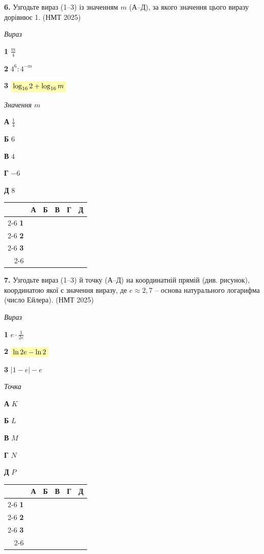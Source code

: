 \documentclass[14pt]{extarticle}
\newcommand{\answerGrid}{
    \begingroup
    \renewcommand{\arraystretch}{1.3} 
    \setlength{\tabcolsep}{7pt} 
    \begin{tabular}{r|c|c|c|c|c|}
         \multicolumn{1}{c}{} & \multicolumn{1}{c}{\textbf{А}} & \multicolumn{1}{c}{\textbf{Б}} & \multicolumn{1}{c}{\textbf{В}} & \multicolumn{1}{c}{\textbf{Г}} & \multicolumn{1}{c}{\textbf{Д}} \\ \cline{2-6}
         \textbf{1} & & & & & \\ \cline{2-6}
         \textbf{2} & & & & & \\ \cline{2-6}
         \textbf{3} & & & & & \\ \cline{2-6}
    \end{tabular}
    \endgroup
}
\newcommand{\matchingLayout}[3]{
    \noindent
    \begin{minipage}[t]{0.40\textwidth}
        #1
    \end{minipage}%
    \hfill
    \begin{minipage}[t]{0.28\textwidth}
        #2
    \end{minipage}%
    \hfill
    \begin{minipage}[t]{0.30\textwidth}
        \vspace{0pt}
        \begin{flushright}
        #3
        \end{flushright}
    \end{minipage}
}
\newcommand{\nmtyear}[1]{\hfill{\small\color{yearcolor}(НМТ #1)}}
\begin{document}
\noindent\textbf{6.} Узгодьте вираз (1--3) із значенням $m$ (А--Д), за якого значення цього виразу дорівнює 1. \nmtyear{2025}
\vspace{0.3cm}

\matchingLayout{\textit{Вираз}

\textbf{1} \quad $\displaystyle\frac{m}{4}$

\textbf{2} \quad $4^6 : 4^{-m}$

\textbf{3} \quad $\colorbox{yellow!30}{$\log_{16} 2 + \log_{16} m$}$
}{
\textit{Значення $m$}

\textbf{А} \quad $\displaystyle\frac{1}{4}$

\textbf{Б} \quad $6$

\textbf{В} \quad $4$

\textbf{Г} \quad $-6$

\textbf{Д} \quad $8$
}{
\answerGrid
}

\vspace{0.8cm}

\noindent\textbf{7.} Узгодьте вираз (1--3) й точку (А--Д) на координатній прямій (див. рисунок), координатою якої є значення виразу, де $e \approx 2{,}7$ -- основа натурального логарифма (число Ейлера). \nmtyear{2025}
\vspace{0.3cm}

\begin{center}
\end{center}

\vspace{0.3cm}

\matchingLayout{\textit{Вираз}

\textbf{1} \quad $e \cdot \displaystyle\frac{1}{2e}$

\textbf{2} \quad $\colorbox{yellow!30}{$\ln 2e - \ln 2$}$

\textbf{3} \quad $|1 - e| - e$
}{
\textit{Точка}

\textbf{А} \quad $K$

\textbf{Б} \quad $L$

\textbf{В} \quad $M$

\textbf{Г} \quad $N$

\textbf{Д} \quad $P$
}{
\answerGrid
}
\end{document}
